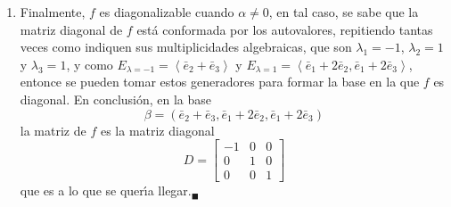 \begin{solucion}
\begin{enumerate}[$a$)]
  \item Finalmente, $f$ es diagonalizable cuando $\alpha \neq 0$, en tal caso, se sabe que la matriz diagonal de $f$ est\'a conformada por los autovalores, repitiendo tantas veces como indiquen sus multiplicidades algebraicas, que son $\lambda_1 = -1$, $\lambda_2 = 1$ y $\lambda_3 = 1$, y como $E_{\lambda=-1} = \left< \bar{e}_2 + \bar{e}_3 \right>$ y $E_{\lambda=1} = \left< \bar{e}_1 + 2\bar{e}_2, \bar{e}_1 + 2\bar{e}_3 \right>$, entonce se pueden tomar estos generadores para formar la base en la que $f$ es diagonal. En conclusi\'on, en la base
  \begin{equation*}
   \beta = \left( \bar{e}_2 + \bar{e}_3, \bar{e}_1 + 2\bar{e}_2, \bar{e}_1 + 2\bar{e}_3 \right)
  \end{equation*}
  la matriz de $f$ es la matriz diagonal
  \begin{equation*}
   D =
   \begin{bmatrix}
    -1 & 0 & 0 \\
     0 & 1 & 0 \\
     0 & 0 & 1
   \end{bmatrix}
  \end{equation*}
  que es a lo que se quer\'{\i}a llegar.${}_{\blacksquare}$
 \end{enumerate}
\end{solucion}
